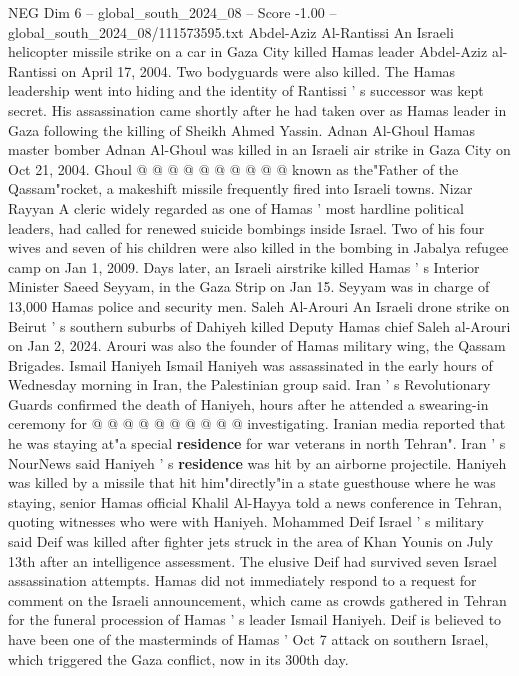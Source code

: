 \begin{textsample}{NEG Dim 6 – global\_south\_2024\_08 – Score -1.00 – global\_south\_2024\_08/111573595.txt}
Abdel-Aziz Al-Rantissi An Israeli helicopter missile strike on a car in Gaza City killed Hamas leader Abdel-Aziz al-Rantissi on April 17, 2004.
Two bodyguards were also killed.
The Hamas leadership went into hiding and the identity of Rantissi ' s successor was kept secret.
His assassination came shortly after he had taken over as Hamas leader in Gaza following the killing of Sheikh Ahmed Yassin.
Adnan Al-Ghoul Hamas master bomber Adnan Al-Ghoul was killed in an Israeli air strike in Gaza City on Oct 21, 2004.
Ghoul @ @ @ @ @ @ @ @ @ @ known as the"Father of the Qassam"rocket, a makeshift missile frequently fired into Israeli towns.
Nizar Rayyan A cleric widely regarded as one of Hamas ' most hardline political leaders, had called for renewed suicide bombings inside Israel.
Two of his four wives and seven of his children were also killed in the bombing in Jabalya refugee camp on Jan 1, 2009.
Days later, an Israeli airstrike killed Hamas ' s Interior Minister Saeed Seyyam, in the Gaza Strip on Jan 15.
Seyyam was in charge of 13,000 Hamas police and security men.
Saleh Al-Arouri An Israeli drone strike on Beirut ' s southern suburbs of Dahiyeh killed Deputy Hamas chief Saleh al-Arouri on Jan 2, 2024.
Arouri was also the founder of Hamas military wing, the Qassam Brigades.
Ismail Haniyeh Ismail Haniyeh was assassinated in the early hours of Wednesday morning in Iran, the Palestinian group said.
Iran ' s Revolutionary Guards confirmed the death of Haniyeh, hours after he attended a swearing-in ceremony for @ @ @ @ @ @ @ @ @ @ investigating.
Iranian media reported that he was staying at"a special \textbf{residence} for war veterans in north Tehran".
Iran ' s NourNews said Haniyeh ' s \textbf{residence} was hit by an airborne projectile.
Haniyeh was killed by a missile that hit him"directly"in a state guesthouse where he was staying, senior Hamas official Khalil Al-Hayya told a news conference in Tehran, quoting witnesses who were with Haniyeh.
Mohammed Deif Israel ' s military said Deif was killed after fighter jets struck in the area of Khan Younis on July 13th after an intelligence assessment.
The elusive Deif had survived seven Israel assassination attempts.
Hamas did not immediately respond to a request for comment on the Israeli announcement, which came as crowds gathered in Tehran for the funeral procession of Hamas ' s leader Ismail Haniyeh.
Deif is believed to have been one of the masterminds of Hamas ' Oct 7 attack on southern Israel, which triggered the Gaza conflict, now in its 300th day.

\end{textsample}
